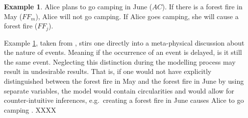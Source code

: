 \documentclass[11pt,a4paper]{book}
\theoremstyle{definition}
\theoremstyle{definition}
\newtheorem{example}{Example}[section]
\theoremstyle{definition}
\theoremstyle{remark}
\begin{document}
\begin{example}
\label{ex:time-1}
Alice plans to go camping in June ($AC$). If there is a forest fire in May ($FF_m$), Alice will not go camping.
If Alice goes camping, she will cause a forest fire ($FF_j$).
\end{example}
%
%
%
%
%
%	
%	
%    
%
Example \ref{ex:time-1},  taken from \parencite{halpern2011actual}, stirs one directly into a meta-physical discussion about the nature of events. 
Meaning if the occurrence of an event is delayed, is it still the same event. Neglecting this distinction during the modelling process may result in undesirable results.
That is, if one would not have explicitly distinguished between the forest fire in May and the forest fire in June by using separate variables, the model would contain circularities and would allow for counter-intuitive inferences, e.g.\ creating a forest fire in June causes Alice to go camping \parencite{halpern2011actual}.  
XXXX
 
\end{document}
